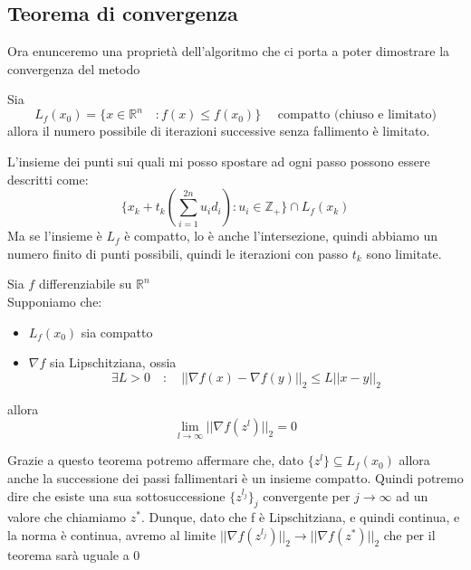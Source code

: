 \subsection{Teorema di convergenza} Ora enunceremo una propriet\`a
dell'algoritmo che ci porta a poter dimostrare la convergenza del
metodo

\begin{lemma} Sia
$$L_{f}(x_{0}) = \{ x \in \mathbb{R}^{n} \quad : f(x) \leq f(x_{0})\} \quad 
\text{ compatto (chiuso e limitato)} $$ allora il numero possibile di
iterazioni successive senza fallimento \`e limitato. \\
\end{lemma}
\begin{thproof} L'insieme dei punti sui quali mi posso spostare ad
ogni passo possono essere descritti come:
$$ \{ x_k + t_k(\displaystyle \sum_{i=1}^{2n} u_i d_i) :
 u_i \in \mathbb{Z}_{+} \} \cap L_{f}(x_{k})$$ Ma se l'insieme \`e
$L_{f}$ \`e compatto, lo \`e anche l'intersezione, quindi abbiamo un
numero finito di punti possibili, quindi le iterazioni con passo $t_k$
sono limitate.\\
\end{thproof}

\begin{theo}[Convergenza] Sia $f$ differenziabile su $\mathbb{R}^{n}$
\\ Supponiamo che:
 \begin{itemize}
  \item $L_{f}(x_{0})$ sia compatto
  \item $\nabla f$ sia Lipschitziana, ossia $$ \exists L > 0 \quad :
\quad || \nabla f(x) - \nabla f(y) ||_{2} \leq L || x - y ||_{2}$$
 \end{itemize} allora
 $$\lim_{l \to \infty } || \nabla f(z^{l}) ||_{2} = 0 $$
\end{theo}

Grazie a questo teorema potremo affermare che, dato $\{ z^{l} \}
\subseteq L_{f}(x_{0})$ allora anche la successione dei passi
fallimentari \`e un insieme compatto. Quindi potremo dire che esiste una
sua sottosuccessione $\{ z^{l_j} \}_{j}$ convergente per $j
\rightarrow \infty$ ad un valore che chiamiamo $z^{*}$. Dunque, dato
che f \`e Lipschitziana, e quindi continua, e la norma \`e continua,
avremo al limite $|| \nabla f(z^{l_j}) ||_{2} \rightarrow || \nabla
f(z^{*})||_{2}$ che per il teorema sar\`a uguale a 0 \\

